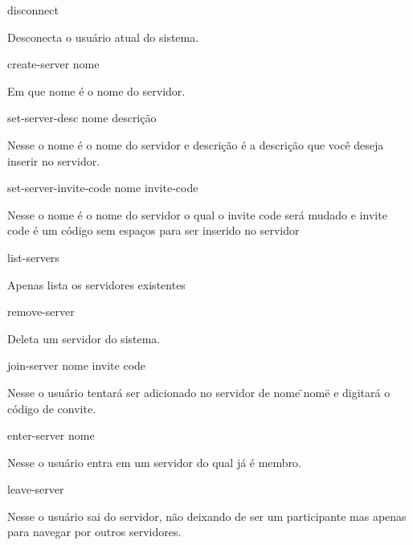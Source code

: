 \begin{DoxyItemize}
\item disconnect

Desconecta o usuário atual do sistema.
\item create-\/server nome

Em que nome é o nome do servidor.
\item set-\/server-\/desc nome descrição

Nesse o nome é o nome do servidor e descrição é a descrição que você deseja inserir no servidor.
\item set-\/server-\/invite-\/code nome invite-\/code

Nesse o nome é o nome do servidor o qual o invite code será mudado e invite code é um código sem espaços para ser inserido no servidor
\item list-\/servers

Apenas lista os servidores existentes
\item remove-\/server

Deleta um servidor do sistema.
\item join-\/server nome invite code

Nesse o usuário tentará ser adicionado no servidor de nome \"{}nome\"{} e digitará o código de convite.
\item enter-\/server nome

Nesse o usuário entra em um servidor do qual já é membro.
\item leave-\/server

Nesse o usuário sai do servidor, não deixando de ser um participante mas apenas para navegar por outros servidores. 
\end{DoxyItemize}